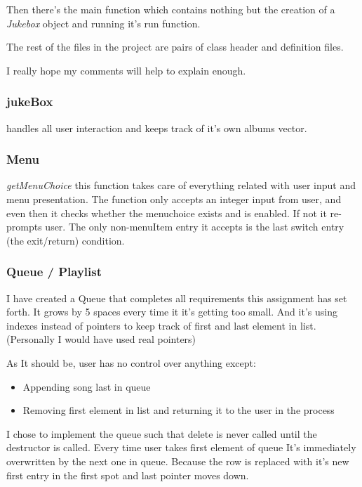 \documentclass[11pt]{article}
\begin{document}
Then there's the main function which contains nothing but the creation of a \emph{Jukebox} object and running it's run function. 

The rest of the files in the project are pairs of class header and definition files.

I really hope my comments will help to explain enough.

\subsubsection{jukeBox}
handles all user interaction and keeps track of it's own albums vector.

\subsubsection{Menu}
\emph{getMenuChoice} this function takes care of everything related with user input and menu presentation. The function only accepts an integer input from user, and even then it checks whether the menuchoice exists and is enabled. If not it re-prompts user. The only non-menuItem entry it accepts is the last switch entry (the exit/return) condition.
\subsubsection{Queue / Playlist}
I have created a Queue that completes all requirements this assignment has set forth. It grows by 5 spaces every time it it's getting too small. And it's using indexes instead of pointers to keep track of first and last element in list. (Personally I would have used real pointers)

As It should be, user has no control over anything except: 
\begin{itemize}
\item Appending song last in queue
\item Removing first element in list and returning it to the user in the process
\end{itemize}

I chose to implement the queue such that delete is never called until the destructor is called.
Every time user takes first element of queue It's immediately overwritten by the next one in queue. Because the row is replaced with it's new first entry in the first spot and last pointer moves down.
\pagebreak
\end{document}
